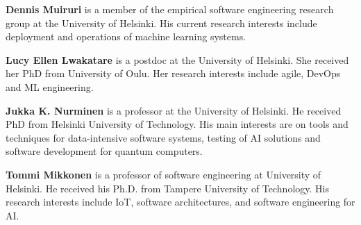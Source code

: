 \textbf{Dennis Muiruri} is a member of the empirical software engineering research group at the University of Helsinki. His current research interests include deployment and operations of machine learning systems.

\textbf{Lucy Ellen Lwakatare} is a postdoc at the University of Helsinki. She received her PhD from University of Oulu.
Her research interests include agile, DevOps and ML engineering.

\textbf{Jukka K. Nurminen} is a professor at the University of Helsinki. 
He received PhD from Helsinki University of Technology. His main interests are on tools and techniques for data-intensive software systems, testing of AI solutions and software development for quantum computers.

\textbf{Tommi Mikkonen} is a professor of software engineering at University of Helsinki. He received his Ph.D. from Tampere University of Technology. His research interests include IoT, software architectures, and software engineering for AI.
